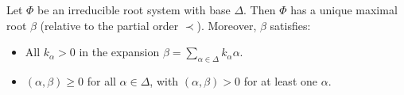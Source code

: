 Let $\Phi$ be an irreducible root system with base $\Delta$. Then $\Phi$ has a unique maximal root $\beta$ (relative to the partial order $\prec$). Moreover, $\beta$ satisfies:
\begin{itemize}
\item All $k_\alpha > 0$ in the expansion $\beta = \sum_{\alpha \in \Delta} k_\alpha \alpha$.
\item $(\alpha, \beta) \geq 0$ for all $\alpha \in \Delta$, with $(\alpha, \beta) > 0$ for at least one $\alpha$.
\end{itemize}